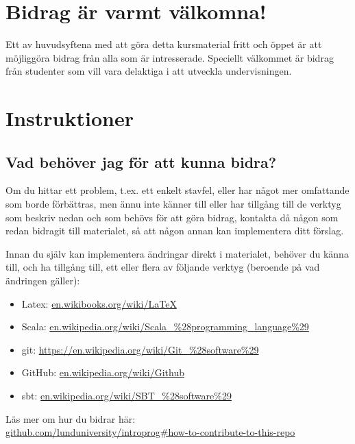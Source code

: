


\section*{Bidrag är varmt välkomna!}

Ett av huvudsyftena med att göra detta kursmaterial fritt och öppet är att möjliggöra bidrag från alla som är intresserade. Speciellt välkommet är bidrag från studenter som vill vara delaktiga i att utveckla undervisningen.

\section*{Instruktioner}

\subsection*{Vad behöver jag för att kunna bidra?}

Om du hittar ett problem, t.ex. ett enkelt stavfel, eller har något mer omfattande som borde förbättras, men ännu inte känner till eller har tillgång till de verktyg som beskriv nedan och som behövs för att göra bidrag, kontakta då någon som redan bidragit till materialet, så att någon annan kan implementera ditt förslag.

Innan du själv kan implementera ändringar direkt i materialet, behöver du känna till, och ha tillgång  till, ett eller flera av följande verktyg (beroende på vad ändringen gäller):

\begin{itemize}[noitemsep]
\item Latex: \href{https://en.wikibooks.org/wiki/LaTeX}{en.wikibooks.org/wiki/LaTeX}
\item Scala: \href{https://en.wikipedia.org/wiki/Scala\_\%28programming_language\%29}{en.wikipedia.org/wiki/Scala\_\%28programming\_language\%29}
\item git: \href{https://en.wikipedia.org/wiki/Git\_\%28software\%29}{https://en.wikipedia.org/wiki/Git\_\%28software\%29}
\item GitHub: \href{https://en.wikipedia.org/wiki/Github}{en.wikipedia.org/wiki/Github}
\item sbt: \href{https://en.wikipedia.org/wiki/SBT\_\%28software\%29}{en.wikipedia.org/wiki/SBT\_\%28software\%29}
\end{itemize}
Läs mer om hur du bidrar här: \\ \href{https://github.com/lunduniversity/introprog#how-to-contribute-to-this-repo}{github.com/lunduniversity/introprog\#how-to-contribute-to-this-repo}



